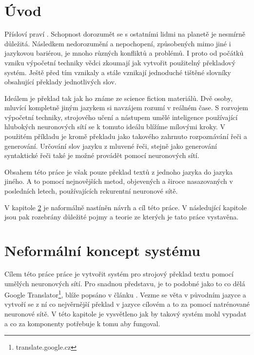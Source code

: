 \chapter{Úvod}
Přísloví praví . Schopnost dorozumět se s ostatními lidmi na planetě je nesmírně důležitá. Následkem nedorozumění a nepochopení, způsobených mimo jiné i jazykovou bariérou, je mnoho různých konfliktů a problémů. I proto od počátků vzniku výpočetní techniky vědci zkoumají jak vytvořit použitelný překladový systém. Ještě před tím vznikaly a stále vznikají jednoduché tištěné slovníky obsahující překlady jednotlivých slov.

Ideálem je překlad tak jak ho známe ze science fiction materiálů. Dvě osoby, mluvící kompletně jiným jazykem si navzájem rozumí v reálném čase. S rozvojem výpočetní techniky, strojového učení a nástupem umělé inteligence používající hlubokých neuronových sítí se k tomuto ideálu blížíme mílovými kroky. V použitém příkladu je kromě překladu jako takového zahrnuto rozpoznávání řeči a generování. Určování slov jazyku z mluvené řeči, stejně jako generování syntaktické řeči také je možné provádět pomocí neuronových sítí.

Obsahem této práce je však pouze překlad textů z jednoho jazyka do jazyka jiného. A to pomocí nejnovějších metod, objevených a široce nasazovaných v posledních letech, používajících rekurentní neuronové sítě.

V kapitole \ref{chapter:draft} je naformálně nastíněn návrh a cíl této práce. V následující kapitole jsou pak rozebrány důležité pojmy a teorie ze kterých je tato práce vystavěna.

\chapter{Neformální koncept systému} \label{chapter:draft}
Cílem této práce práce je vytvořit systém pro strojový překlad textu pomocí umělých neuronových sítí. Pro snadnou představu, je to podobné jako to co dělá Google Translator\footnote{translate.google.cz}, blíže popsáno v článku \cite{googleBridgingGap}. Vezme se věta v původním jazyce a vytvoří se z ní co nejvěrnější překlad v jazyce cílovém a to za pomocí natrénované neuronové sítě. V této kapitole je vysvětleno jak by takový systém mohl vypadat a co za komponenty potřebuje k tomu aby fungoval.

